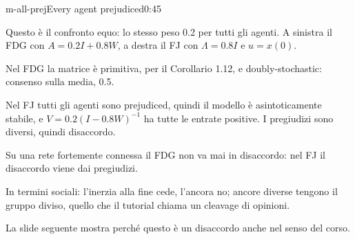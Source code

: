 \begin{slide}{m-all-prej}{Every agent prejudiced}{0:45}
  \begin{discorso}
    \item Questo è il confronto equo: lo stesso peso 0.2 per tutti gli agenti. A sinistra il FDG con $A=0.2I+0.8W$, a destra il FJ con $\Lambda=0.8I$ e $u=x(0)$.
    \item Nel FDG la matrice è primitiva, per il Corollario 1.12, e doubly-stochastic: consenso sulla media, 0.5.
    \item Nel FJ tutti gli agenti sono prejudiced, quindi il modello è asintoticamente stabile, e $V=0.2(I-0.8W)^{-1}$ ha tutte le entrate positive. I pregiudizi sono diversi, quindi disaccordo.
    \item Su una rete fortemente connessa il FDG non va mai in disaccordo: nel FJ il disaccordo viene dai pregiudizi.
    \item In termini sociali: l'inerzia alla fine cede, l'ancora no; ancore diverse tengono il gruppo diviso, quello che il tutorial chiama un cleavage di opinioni.
    \item La slide seguente mostra perché questo è un disaccordo anche nel senso del corso.
  \end{discorso}
\end{slide}

